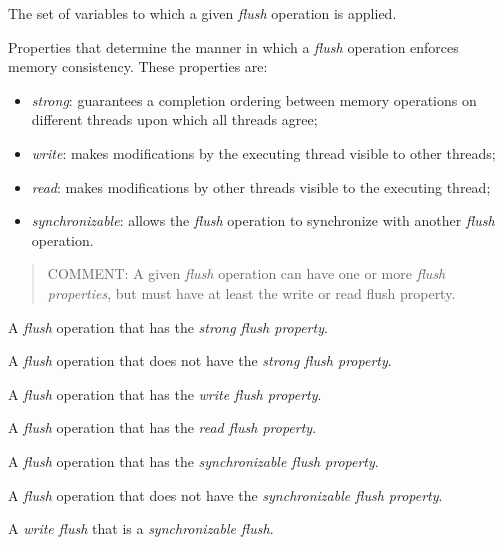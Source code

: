 \glossarydefstart
The set of variables to which a given \emph{flush} operation is applied.
\glossarydefend

\glossarydefstart
Properties that determine the manner in which a \emph{flush} operation enforces
memory consistency. These properties are:
\begin{itemize}
    \item \emph{strong}:  guarantees a completion ordering between memory operations
        on different threads upon which all threads agree;
    \item \emph{write}: makes modifications by the executing thread visible
        to other threads;
    \item \emph{read}: makes modifications by other threads visible to the
        executing thread;
    \item \emph{synchronizable}: allows the \emph{flush} operation to
        synchronize with another \emph{flush} operation.
\end{itemize}

\begin{quote}
COMMENT: A given \emph{flush} operation can have one or more \emph{flush
properties}, but must have at least the write or read flush property.
\end{quote}
\glossarydefend

\glossarydefstart
A \emph{flush} operation that has the \emph{strong flush property}.
\glossarydefend

\glossarydefstart
A \emph{flush} operation that does not have the \emph{strong flush property}.
\glossarydefend

\glossarydefstart
A \emph{flush} operation that has the \emph{write flush property}.
\glossarydefend

\glossarydefstart
A \emph{flush} operation that has the \emph{read flush property}.
\glossarydefend

\glossarydefstart
A \emph{flush} operation that has the \emph{synchronizable flush property}.
\glossarydefend

\glossarydefstart
A \emph{flush} operation that does not have the \emph{synchronizable flush
property}.
\glossarydefend

\glossarydefstart
A \emph{write flush} that is a \emph{synchronizable flush}.
\glossarydefend

